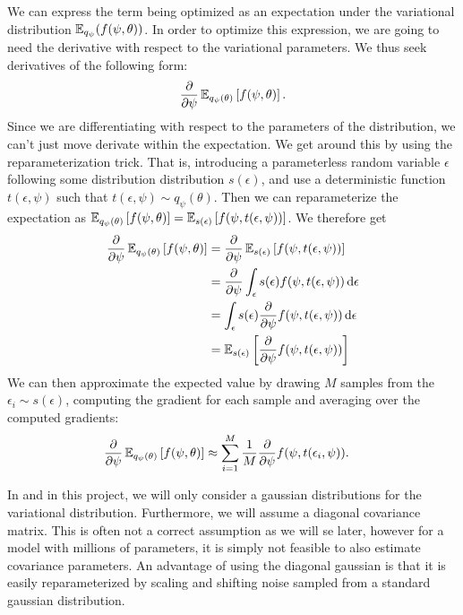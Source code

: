 We can express the term being optimized as an expectation under the variational distribution $\operatorname{\mathbb{E}}_{q_{\psi}}(f(\psi, \theta))$.
In order to optimize this expression, we are going to need the derivative with respect to the variational parameters.
We thus seek derivatives of the following form:
\begin{align*}
    \pdv{\psi} \operatorname{\mathbb{E}}_{q_\psi(\theta)}\left[ f(\psi, \theta) \right].
\end{align*}
Since we are differentiating with respect to the parameters of the distribution, we can't just move derivate within the expectation.
We get around this by using the reparameterization trick.
That is, introducing a parameterless random variable $\epsilon$ following some distribution distribution $s(\epsilon)$, and use a deterministic function $t(\epsilon, \psi)$ such that $t(\epsilon, \psi) \sim q_\psi(\theta)$.
Then we can reparameterize the expectation as
$ \operatorname{\mathbb{E}}_{q_\psi(\theta)}\left[ f(\psi, \theta) \right] = \operatorname{\mathbb{E}}_{s(\epsilon)}\left[ f(\psi, t(\epsilon, \psi)) \right]$.
We therefore get
\begin{equation}
    \begin{aligned}
        \pdv{\psi} \operatorname{\mathbb{E}}_{q_\psi(\theta)}\left[ f(\psi, \theta) \right] &= \pdv{\psi}\operatorname{\mathbb{E}}_{s(\epsilon)}\left[ f(\psi, t(\epsilon, \psi)) \right] \\
        &= \pdv{\psi} \int_\epsilon s(\epsilon) f(\psi, t(\epsilon, \psi))\dd{\epsilon}\\
        &= \int_\epsilon s(\epsilon) \pdv{\psi} f(\psi, t(\epsilon, \psi)) \dd{\epsilon}\\
        &= \operatorname{\mathbb{E}}_{s(\epsilon)} \left[ \pdv{\psi} f(\psi, t(\epsilon, \psi)) \right]
    \end{aligned}
\end{equation}
We can then approximate the expected value by drawing $M$ samples from the $\epsilon_i\sim s(\epsilon)$, computing the gradient for each sample and averaging over the computed gradients:
\begin{equation} 
    \begin{aligned}
        \pdv{\psi} \operatorname{\mathbb{E}}_{q_\psi(\theta)}\left[ f(\psi, \theta) \right] &\approx \sum_{i=1}^{M} \frac{1}{M} \pdv{\psi} f(\psi, t(\epsilon_i, \psi)).  
    \end{aligned}
\end{equation}

In \cite{blundell_weight_2015} and in this project, we will only consider a gaussian distributions for the variational distribution.
Furthermore, we will assume a diagonal covariance matrix. 
This is often not a correct assumption as we will se later, however for a model with millions of parameters, it is simply not feasible to also estimate covariance parameters. 
An advantage of using the diagonal gaussian is that it is easily reparameterized by scaling and shifting noise sampled from a standard gaussian distribution.


